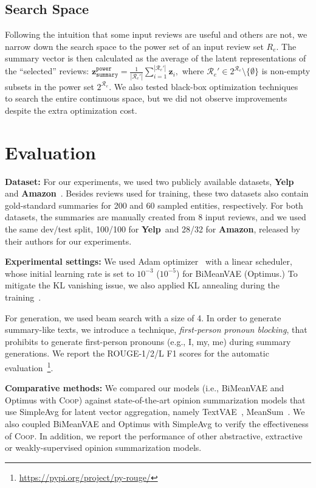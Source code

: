 \documentclass[11pt]{article}
\newcommand{\aggname}{\textsc{Coop}}
\newcommand{\name}{\mbox{\sc BiMeanVAE}}
\newcommand{\simpleavg}{\mbox{SimpleAvg}}
\newcommand{\yelp}{\mbox{\bf Yelp}}
\newcommand{\amazon}{\mbox{\bf Amazon}}
\newcommand{\hl}[1]{#1}
\newcommand{\hla}[1]{#1}
\begin{document}
\subsection{Search Space}
\label{sub:powerset}
Following the intuition that some input reviews are useful and others are not, we narrow down the search space to the power set of an input review set $R_e$. The summary vector is then calculated as the average of the latent representations of the ``selected'' reviews:
$\boldsymbol{z}_{\texttt{summary}}^{\texttt{power}} = \frac{1}{|\mathcal{R}_e'|} \sum_{i = 1}^{|\mathcal{R}_e'|} \boldsymbol{z}_i,$
where $\mathcal{R}_e' \in 2^{\mathcal{R}_e}\setminus \{\emptyset\}$ is non-empty \hla{subsets} in the power set $2^{\mathcal{R}_e}$.
We also tested black-box 
optimization techniques~\cite{audet2017derivative}
to search the entire \hl{continuous} space, but we did not observe improvements despite the extra optimization cost.

\section{Evaluation}\label{sec:exp}
\noindent
{\bf Dataset:} For our experiments, we used two publicly available datasets, \yelp~\cite{Chu:2019:MeanSum} and \amazon~\cite{brazinskas-etal-2020-unsupervised}. Besides reviews used for training, these two datasets also contain gold-standard summaries for 200 and 60 sampled entities, respectively. For both datasets, the summaries are manually created from 8 input reviews, and we used the same dev/test split, 100/100 for \yelp\ and 28/32 for \amazon, released by their authors for our experiments. 

\noindent
{\bf Experimental settings:}
We used Adam optimizer~\cite{kingma2015adam} with a linear scheduler, whose initial learning rate is set to $10^{-3}$ ($10^{-5}$) for \name{} (Optimus.)
To mitigate the KL vanishing issue, we also applied KL annealing during the training~\cite{kingma2016improved,fu-etal-2019-cyclical,li-etal-2019-surprisingly}.

For generation, we used beam search with a size of 4.
In order to generate summary-like texts, we introduce a technique, \textit{first-person pronoun blocking}, that prohibits to generate first-person pronouns (e.g., I, my, me) during summary generations.
We report the ROUGE-1/2/L F1 scores for the automatic evaluation~\cite{lin-2004-rouge}\footnote{\url{https://pypi.org/project/py-rouge/}}.

\noindent
{\bf Comparative methods:}
We compared our models (i.e., \name{} and Optimus with \aggname) against state-of-the-art opinion summarization models that use \simpleavg{} for latent vector aggregation, namely
TextVAE~\cite{bowman-etal-2016-generating},
MeanSum~\cite{Chu:2019:MeanSum}.
We also coupled \name{} and Optimus with \simpleavg{} to verify the effectiveness of \aggname.
\hl{In addition, we report the performance of other abstractive, extractive or weakly-supervised opinion summarization models.}
\end{document}
